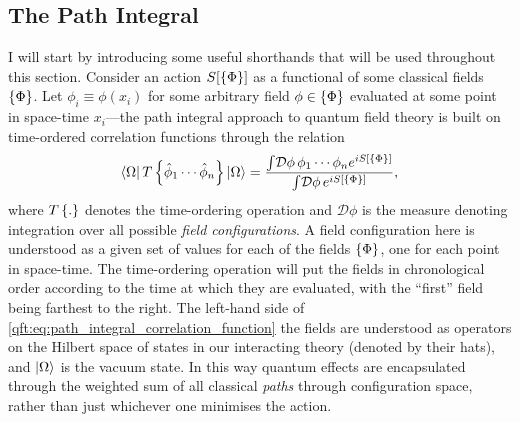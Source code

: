 \documentclass[../main.tex]{subfiles}
\begin{document}
\subsection{The Path Integral}
I will start by introducing some useful shorthands that will be used throughout this section.
Consider an action \(S[\left\{\Phi\right\}]\) as a functional of some classical fields \(\left\{\Phi\right\}\). Let \(\phi_i \equiv \phi(x_i)\) for some arbitrary field \(\phi \in \left\{\Phi\right\}\) evaluated at some point in space-time \(x_i\)---the path integral approach to quantum field theory is built on time-ordered correlation functions through the relation\needcite\
\begin{equation}
  \label{qft:eq:path_integral_correlation_function}
  \left\langle \Omega \right| T\left\{\hat\phi_1 \cdots \hat\phi_n\right\} \left| \Omega \right\rangle = \frac{\int\!\mathcal{D}\phi\, \phi_1 \cdots \phi_n e^{iS[\left\{\Phi\right\}]}}{\int\!\mathcal{D}\phi\, e^{iS[\left\{\Phi\right\}]}},
\end{equation}
where \(T\left\{.\right\}\) denotes the time-ordering operation and \(\mathcal{D}\phi\) is the measure denoting integration over all possible \emph{field configurations}.
A field configuration here is understood as a given set of values for each of the fields \(\left\{\Phi\right\}\), one for each point in space-time.
The time-ordering operation will put the fields in chronological order according to the time at which they are evaluated, with the ``first'' field being farthest to the right.
The left-hand side of \cref{qft:eq:path_integral_correlation_function} the fields are understood as operators on the Hilbert space of states in our interacting theory (denoted by their hats), and \(\left| \Omega \right\rangle\) is the vacuum state.
In this way quantum effects are encapsulated through the weighted sum of all classical \emph{paths} through configuration space, rather than just whichever one minimises the action.
\end{document}
